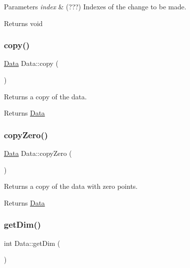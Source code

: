 \begin{DoxyParams}{Parameters}
{\em index} & (???) Indexes of the change to be made. \\
\hline
\end{DoxyParams}
\begin{DoxyReturn}{Returns}
void 
\end{DoxyReturn}
\mbox{\label{class_data_afb7687021aa7d5f1ecae464eee601710}} 
\subsubsection{\texorpdfstring{copy()}{copy()}}
{\footnotesize\ttfamily \hyperlink{class_data}{Data} Data\+::copy (\begin{DoxyParamCaption}{ }\end{DoxyParamCaption})}



Returns a copy of the data. 

\begin{DoxyReturn}{Returns}
\hyperlink{class_data}{Data} 
\end{DoxyReturn}
\mbox{\label{class_data_ae9f7aeb470be537dc20c43b317dc6478}} 
\subsubsection{\texorpdfstring{copy\+Zero()}{copyZero()}}
{\footnotesize\ttfamily \hyperlink{class_data}{Data} Data\+::copy\+Zero (\begin{DoxyParamCaption}{ }\end{DoxyParamCaption})}



Returns a copy of the data with zero points. 

\begin{DoxyReturn}{Returns}
\hyperlink{class_data}{Data} 
\end{DoxyReturn}
\mbox{\label{class_data_a0391940729a8023ea9b154132a854d35}} 
\subsubsection{\texorpdfstring{get\+Dim()}{getDim()}}
{\footnotesize\ttfamily int Data\+::get\+Dim (\begin{DoxyParamCaption}{ }\end{DoxyParamCaption})}



